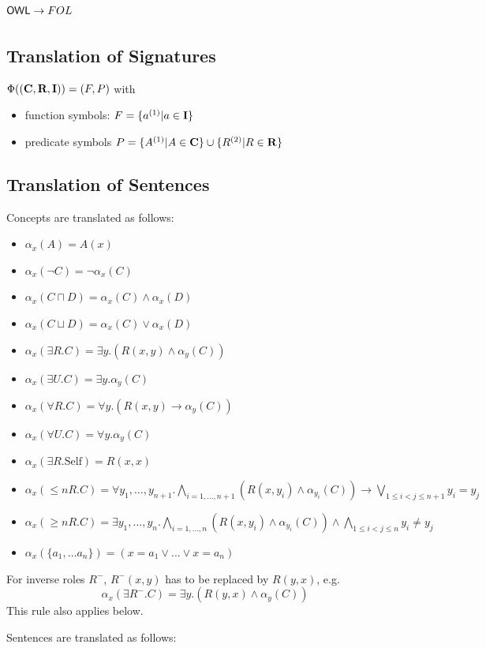 \documentclass[10pt,%
\ifpretendfinal
final%
\else
draft%
\fi,
]{scrreprt}
\newcommand{\sclause}[1]{\section{#1}}
\newcommand{\ssclause}[1]{\subsection{#1}}
\begin{document}
\sclause{$\mathsf{OWL} \rightarrow FOL$}

\ssclause{Translation of Signatures}

 $\Phi((\textbf{C}, \textbf{R}, \textbf{I})) =  (F, P)$ with
\begin{itemize}
	\item function symbols: $F = \{a^{(1)} \vert a \in \textbf{I}\}$
	\item predicate symbols $P = \{A^{(1)} \vert A \in \mathbf{C} \} \cup \{ R^{(2)} \vert R \in \mathbf{R}\}$
\end{itemize}


\ssclause{Translation of Sentences}

Concepts are translated as follows:
\begin{itemize}
 \item $\alpha_x(A) = A(x)$
 \item $\alpha_x(\lnot C) = \lnot \alpha_x (C)$
 \item $\alpha_x(C \sqcap D) = \alpha_x(C) \land \alpha_x(D)$
 \item $\alpha_x(C \sqcup D) = \alpha_x(C) \lor \alpha_x(D)$ 
 \item $\alpha_x(\exists R.C) = \exists y . (R(x,y) \land \alpha_y(C))$
 \item $\alpha_x(\exists U.C) = \exists y . \alpha_y(C)$
 \item $\alpha_x(\forall R.C) = \forall y . (R(x,y) \rightarrow \alpha_y(C))$
 \item $\alpha_x(\forall U.C) = \forall y . \alpha_y(C)$
 \item $\alpha_x(\exists R.\text{Self}) = R(x,x)$
 \item $\alpha_x(\leq n R. C) = \forall y_1,\ldots,y_{n+1} .  \bigwedge_{i=1,\ldots,n+1}(R(x,y_i) \land \alpha_{y_i}(C)) \rightarrow\bigvee_{1\leq i<j\leq n+1}y_i = y_j$
 \item $\alpha_x(\geq n R. C) = \exists y_1,\ldots,y_n . \bigwedge_{i=1,\ldots,n}(R(x,y_i) \land \alpha_{y_i}(C)) \wedge \bigwedge_{1\leq i<j\leq n}y_i\not= y_j $
 \item $\alpha_x(\{a_1, \ldots a_n \}) = (x=a_1\vee \ldots \vee x=a_n)$
\end{itemize}

For inverse roles $R^-$, $R^-(x,y)$ has to be replaced by $R(y,x)$, e.g.
 $$\alpha_x(\exists R^-.C) = \exists y . (R(y,x) \land \alpha_y(C))$$
This rule also applies below.


Sentences are translated as follows:
\end{document}
